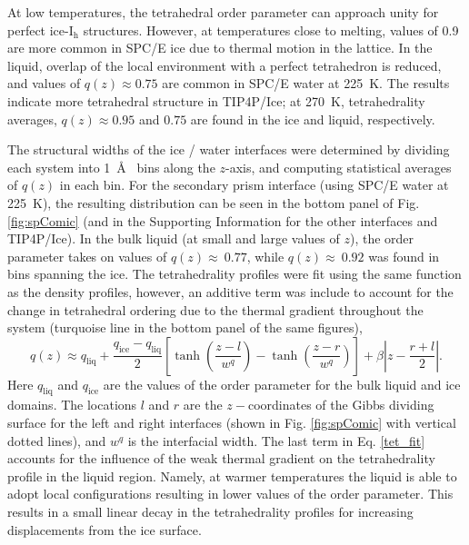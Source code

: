 At low temperatures, the tetrahedral order parameter can approach
unity for perfect ice-I$_\mathrm{h}$ structures. However, at
temperatures close to melting, values of 0.9 are more common in SPC/E
ice due to thermal motion in the lattice. In the liquid, overlap of
the local environment with a perfect tetrahedron is reduced, and
values of $q(z) \approx 0.75$ are common in SPC/E water at 225~K. The
results indicate more tetrahedral structure in TIP4P/Ice; at
270~K, tetrahedrality averages, $q(z) \approx 0.95$ and $0.75$ are
found in the ice and liquid, respectively.

The structural widths of the ice / water interfaces were determined by
dividing each system into 1~\AA~ bins along the $z$-axis, and
computing statistical averages of $q(z)$ in each bin. For the
secondary prism interface (using SPC/E water at 225~K), the resulting
distribution can be seen in the bottom panel of Fig. \ref{fig:spComic}
(and in the Supporting Information for the other interfaces and
TIP4P/Ice). In the bulk liquid (at small and large values of $z$), the
order parameter takes on values of $q(z) \approx~0.77$, while
$q(z) \approx~0.92$ was found in bins spanning the ice. The
tetrahedrality profiles were fit using the same function as the
density profiles, however, an additive term was include to account for
the change in tetrahedral ordering due to the thermal gradient
throughout the system (turquoise line in the
bottom panel of the same figures),
\begin{equation}\label{tet_fit}
q(z) \approx
q_\mathrm{liq}+\frac{q_\mathrm{ice}-q_\mathrm{liq}}{2}\left[\tanh\left(\frac{z-l}{w^q}\right)-\tanh\left(\frac{z-r}{w^q}\right)\right]+\beta\left|z-\frac{r+l}{2}\right|.
\end{equation}
Here $q_\mathrm{liq}$ and $q_\mathrm{ice}$ are the values of the order
parameter for the bulk liquid and ice domains. The locations $l$ and
$r$ are the $z-$coordinates of the Gibbs dividing surface for the left
and right interfaces (shown in Fig. \ref{fig:spComic} with vertical
dotted lines), and $w^{q}$ is the interfacial width.  The last term in
Eq. \eqref{tet_fit} accounts for the influence of the weak thermal
gradient on the tetrahedrality profile in the liquid region. Namely,
at warmer temperatures the liquid is able to adopt local
configurations resulting in lower values of the order parameter. This
results in a small linear decay in the tetrahedrality profiles for
increasing displacements from the ice surface.

